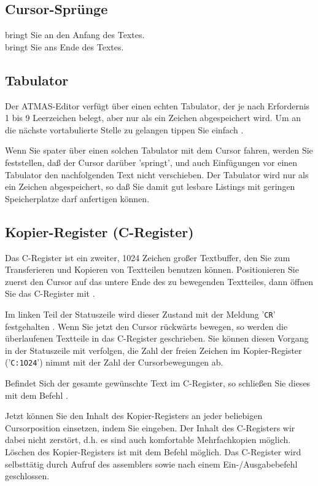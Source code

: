 \documentclass[10pt,a4paper,twoside,final,openright,titlepage]{memoir}
\newcommand{\key}[1]{\keystroke{\tiny #1}}
\begin{document}
\subsection{Cursor-Sprünge}

\key{CTRL-E} bringt Sie an den Anfang des Textes. \\
\key{CTRL-D} bringt Sie ans Ende des Textes.

\subsection{Tabulator}

Der ATMAS-Editor verfügt über einen echten Tabulator,
der je nach Erfordernis 1 bis 9 Leerzeichen belegt,
aber nur als ein Zeichen abgespeichert wird. Um an
die nächste vortabulierte Stelle zu gelangen tippen
Sie einfach \key{TAB}.

Wenn Sie spater über einen solchen Tabulator mit dem
Cursor fahren, werden Sie feststellen, daß der Cursor
darüber 'springt', und auch Einfügungen vor einen
Tabulator den nachfolgenden Text nicht verschieben.
Der Tabulator wird nur als ein Zeichen abgespeichert,
so daß Sie damit gut lesbare Listings mit geringen
Speicherplatze darf anfertigen können.

\subsection{Kopier-Register (C-Register)}

Das C-Register ist ein zweiter, 1024 Zeichen großer
Textbuffer, den Sie zum Transferieren und Kopieren von
Textteilen benutzen können. Positionieren Sie zuerst
den Cursor auf das untere Ende des zu bewegenden
Textteiles, dann öffnen Sie das C-Register mit \key{CTRL-R}.

Im linken Teil der Statuszeile wird dieser Zustand mit
der Meldung '\texttt{CR}' festgehalten . Wenn Sie jetzt den
Cursor rückwärts bewegen, so werden die überlaufenen
Textteile in das C-Register geschrieben. Sie können
diesen Vorgang in der Statuszeile mit verfolgen, die
Zahl der freien Zeichen im Kopier-Register ('\texttt{C:1O24}')
nimmt mit der Zahl der Cursorbewegungen ab.

Befindet Sich der gesamte gewünschte Text im
C-Register, so schließen Sie dieses mit dem Befehl \key{CTRL-F}.

Jetzt können Sie den Inhalt des Kopier-Registers an
jeder beliebigen Cursorposition einsetzen, indem Sie \key{CTRL-J}
eingeben. Der Inhalt des C-Registers wir dabei nicht
zerstört, d.h. es sind auch komfortable Mehrfachkopien
möglich. Löschen des Kopier-Registers ist mit dem
Befehl \key{CTRL-K} möglich. Das C-Register wird selbsttätig durch Aufruf
des assemblers sowie nach einem Ein-/Ausgabebefehl
geschlossen.
\end{document}
